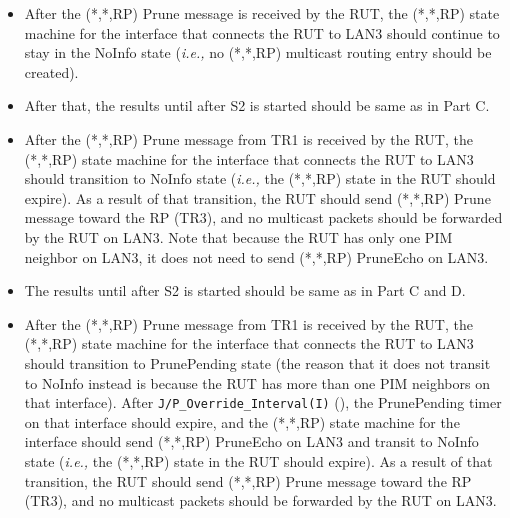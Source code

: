 \documentclass[11pt]{report}
\newcommand{\ie}{\emph{i.e.,}\xspace}
\begin{document}

\begin{itemize}

  \item After the (*,*,RP) Prune message is received by the RUT,
  the (*,*,RP) state machine for the interface that connects the RUT to
  LAN3 should continue to stay in the NoInfo state (\ie no (*,*,RP) multicast
  routing entry should be created).

  \item After that, the results until after S2 is started should be same as in
  Part C.

  \item After the (*,*,RP) Prune message from TR1 is received by the RUT,
  the (*,*,RP) state machine for the interface that connects the RUT to
  LAN3 should transition to NoInfo state
  (\ie the (*,*,RP) state in the RUT should expire).
  As a result of that transition, the RUT should send (*,*,RP) Prune
  message toward the RP (TR3), and no multicast packets should be
  forwarded by the RUT on LAN3. Note that because the RUT has only one
  PIM neighbor on LAN3, it does not need to send (*,*,RP) PruneEcho on
  LAN3.

\end{itemize}


\begin{itemize}

  \item The results until after S2 is started should be same as in
  Part C and D.

  \item After the (*,*,RP) Prune message from TR1 is received by the RUT,
  the (*,*,RP) state machine for the interface that connects the RUT to
  LAN3 should transition to PrunePending state (the reason that it does
  not transit to NoInfo instead is because the RUT has more than one PIM
  neighbors on that interface).
  After \verb=J/P_Override_Interval(I)= (\PimsmJPOverrideIntervalI),
  the PrunePending timer on that interface should expire, and the
  (*,*,RP) state machine for the interface should send (*,*,RP) PruneEcho
  on LAN3 and transit to NoInfo
  state (\ie the (*,*,RP) state in the RUT should expire).
  As a result of that transition, the RUT should send (*,*,RP) Prune
  message toward the RP (TR3), and no multicast packets should be
  forwarded by the RUT on LAN3.

\end{itemize}
\end{document}
